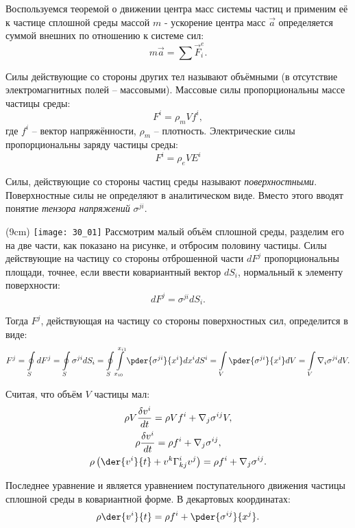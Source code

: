 
Воспользуемся теоремой о движении центра масс системы частиц и применим её к
частице сплошной среды массой \( m \) - ускорение центра масс \( \vec{a} \)
определяется суммой внешних по отношению к системе сил:
\[
    m\vec{a} = \sum \vec{F}_i^e.
\]

Силы действующие со стороны других тел называют объёмными (в отсутствие
электромагнитных полей -- массовыми). Массовые силы пропорциональны массе
частицы среды:
\[
    F^i = \rho_m V f^i,
\]
где \( f^i \) -- вектор напряжённости, \( \rho_m  \) -- плотность. Электрические
силы пропорциональны заряду частицы среды:
\[
    F^i = \rho_e V E^i
\]

Силы, действующие со стороны частиц среды называют \emph{поверхностными}.
Поверхностные силы не определяют в аналитическом виде. Вместо этого вводят
понятие \emph{тензора напряжений} \( \sigma^{ji} \).

\sidefig(9cm)
{\texttt{[image: 30\_01]}}{
Рассмотрим малый объём сплошной среды, разделим его на две части, как показано
на рисунке, и отбросим половину частицы. Силы действующие на частицу со стороны
отброшенной части \( dF^j \) пропорциональны площади, точнее, если ввести
ковариантный вектор \( dS_i \), нормальный к элементу поверхности: 
\[
    dF^j = \sigma^{ji} dS_i.
\]
}

Тогда \( F^j \), действующая на частицу со стороны поверхностных сил,
определится в виде:
\[
    F^j = 
    \oint\limits_S dF^j = 
    \oint\limits_S \sigma^{ji} dS_i =
    \oint\limits_S \int\limits_{x_{i0}}^{x_{i1}} \pder{\sigma^{ji}}{x^i} dx^i
    dS^i =
    \int\limits_V \pder{\sigma^{ji}}{x^i} dV =
    \int\limits_V \nabla_i \sigma^{ji} dV.
\]
    
Считая, что объём \( V \) частицы мал:
\begin{gather*}
    \rho V \frac{\delta v^i}{dt} = \rho V f^i + \nabla_j \sigma^{ij} V,\\
    \rho \frac{\delta v^i}{dt} = \rho f^i + \nabla_j \sigma^{ij}, \\
    \rho \left( \der{v^i}{t} + v^k \Gamma^i_{kj} v^j\right) = \rho f^i +
    \nabla_j \sigma^{ij}.
\end{gather*}

Последнее уравнение и является уравнением поступательного движения частицы
сплошной среды в ковариантной форме. В декартовых координатах:
\begin{gather*}
    \rho  \der{v^i}{t}  = \rho f^i + \pder{ \sigma^{ij}}{x^j}.
\end{gather*}


